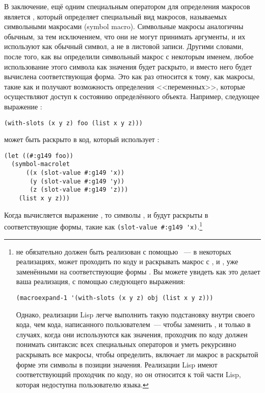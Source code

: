 В заключение, ещё одним специальным оператором для определения макросов является
, который определяет специальный вид макросов, называемых
символьными макросами (symbol macro).  Символьные макросы аналогичны обычным, за тем
исключением, что они не могут принимать аргументы, и их используют как обычный символ, а
не в листовой записи.  Другими словами, после того, как вы определили символьный макрос с
некоторым именем, любое использование этого символа как значения будет раскрыто, и вместо
него будет вычислена соответствующая форма.  Это как раз относится к тому, как макросы,
такие как  и  получают возможность определения
<<переменных>>, которые осуществляют доступ к состоянию определённого объекта.  Например,
следующее выражение :

\begin{lstlisting}
(with-slots (x y z) foo (list x y z)))
\end{lstlisting}

может быть раскрыто в код, который использует :

\begin{lstlisting}
(let ((#:g149 foo))
  (symbol-macrolet
      ((x (slot-value #:g149 'x))
       (y (slot-value #:g149 'y))
       (z (slot-value #:g149 'z)))
    (list x y z)))
\end{lstlisting}

Когда вычисляется выражение , то символы ,  и 
будут раскрыты в соответствующие формы, такие как \lstinline!(slot-value #:g149 'x)!.\footnote{ не обязательно должен быть реализован с помощью
  ~--- в некоторых реализациях,  может проходить по
  коду и раскрывать макрос с ,  и , уже заменёнными на
  соответствующие формы .  Вы можете увидеть как это делает ваша
  реализация, с помощью следующего выражения:

\begin{lstlisting}
(macroexpand-1 '(with-slots (x y z) obj (list x y z)))
\end{lstlisting}

Однако, реализации Lisp легче выполнить такую подстановку внутри своего кода, чем кода,
написанного пользователем~--- чтобы заменить ,  и  только в случаях,
когда они используются как значения, проходчик по коду должен понимать синтаксис всех
специальных операторов и уметь рекурсивно раскрывать все макросы, чтобы определить,
включает ли макрос в раскрытой форме эти символы в позиции значения.  Реализации Lisp
имеют соответствующий проходчик по коду, но он относится к той части Lisp, которая
недоступна пользователю языка.}

